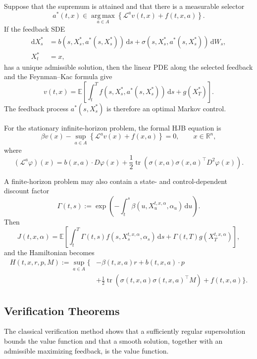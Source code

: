 \begin{remark}
Suppose that the supremum is attained and that there is a measurable selector
\[
a^*(t,x)
\in\operatorname*{arg\,max}_{a\in A}
\left\{
\mathcal L^av(t,x)+f(t,x,a)
\right\}.
\]
If the feedback SDE
\[
\begin{aligned}
\mathrm dX_s^*
&=b(s,X_s^*,a^*(s,X_s^*))\,\mathrm ds
+\sigma(s,X_s^*,a^*(s,X_s^*))\,\mathrm dW_s,\\
X_t^*&=x,
\end{aligned}
\]
has a unique admissible solution, then the linear PDE along the selected feedback and the Feynman--Kac formula give
\[
v(t,x)
=\mathbb E\!\left[
\int_t^T f(s,X_s^*,a^*(s,X_s^*))\,\mathrm ds
+g(X_T^*)
\right].
\]
The feedback process \(a^*(s,X_s^*)\) is therefore an optimal Markov control.
\end{remark}

\begin{remark}
For the stationary infinite-horizon problem, the formal HJB equation is
\[
\beta v(x)
-\sup_{a\in A}
\left\{
\mathcal L^av(x)+f(x,a)
\right\}
=0,
\qquad x\in\mathbb R^n,
\]
where
\[
(\mathcal L^a\varphi)(x)
=b(x,a)\cdot D\varphi(x)
+\frac12\operatorname{tr}\!\left(
\sigma(x,a)\sigma(x,a)^\top D^2\varphi(x)
\right).
\]
\end{remark}

\begin{remark}
A finite-horizon problem may also contain a state- and control-dependent discount factor
\[
\Gamma(t,s)
:=\exp\!\left(
-\int_t^s\beta(u,X_u^{t,x,\alpha},\alpha_u)\,\mathrm du
\right).
\]
Then
\[
J(t,x,\alpha)
=\mathbb E\!\left[
\int_t^T\Gamma(t,s)
 f(s,X_s^{t,x,\alpha},\alpha_s)\,\mathrm ds
+\Gamma(t,T)g(X_T^{t,x,\alpha})
\right],
\]
and the Hamiltonian becomes
\[
\begin{aligned}
H(t,x,r,p,M)
:=\sup_{a\in A}\biggl\{
&-\beta(t,x,a)r
+b(t,x,a)\cdot p\\
&+\frac12\operatorname{tr}\!\left(
\sigma(t,x,a)\sigma(t,x,a)^\top M
\right)
+f(t,x,a)
\biggr\}.
\end{aligned}
\]
\end{remark}

\subsection{Verification Theorems}

The classical verification method shows that a sufficiently regular supersolution bounds the value function and that a smooth solution, together with an admissible maximizing feedback, is the value function.

